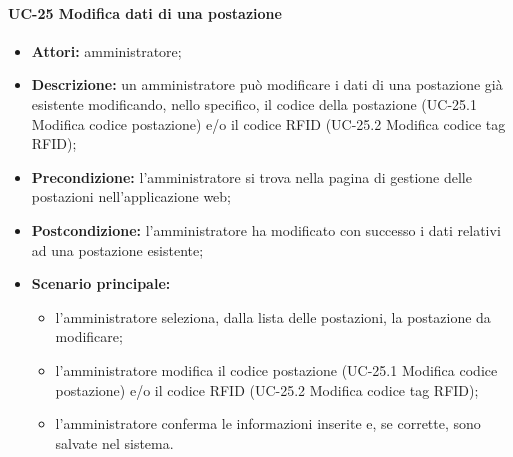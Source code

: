 \paragraph{UC-25 Modifica dati di una postazione}
\begin{itemize}
    \item \textbf{Attori:} amministratore;
    \item \textbf{Descrizione:} un amministratore pu\`{o} modificare i dati di una postazione già esistente modificando, nello specifico, il codice della postazione (UC-25.1 Modifica codice postazione) e/o il codice RFID (UC-25.2 Modifica codice tag RFID);
    \item \textbf{Precondizione:} l'amministratore si trova nella pagina di gestione delle postazioni nell'applicazione web;
    \item \textbf{Postcondizione:} l'amministratore ha modificato con successo i dati relativi ad una postazione esistente;
    \item \textbf{Scenario principale:}
    \begin{itemize}
        \item l'amministratore seleziona, dalla lista delle postazioni, la postazione da modificare;
        \item l'amministratore modifica il codice postazione (UC-25.1 Modifica codice postazione) e/o il codice RFID (UC-25.2 Modifica codice tag RFID);
        \item l'amministratore conferma le informazioni inserite e, se corrette, sono salvate nel sistema.
    \end{itemize}
\end{itemize}


